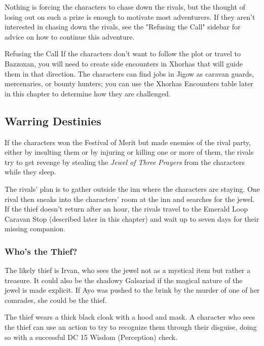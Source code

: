 \documentclass[10pt,a4paper,twoside,fancy,bg=print,twocolumn,openany,nodeprecatedcode]{dndbook}
\begin{document}
Nothing is forcing the characters to chase down the rivals, but the thought of losing out on such a prize is enough to motivate most adventurers. If they aren't interested in chasing down the rivals, see the "Refusing the Call" sidebar for advice on how to continue this adventure.

\begin{DndSidebar}[float=!b]{Refusing the Call}
If the characters don't want to follow the plot or travel to Bazzoxan, you will need to create side encounters in Xhorhas that will guide them in that direction. The characters can find jobs in Jigow as caravan guards, mercenaries, or bounty hunters; you can use the Xhorhas Encounters table later in this chapter to determine how they are challenged.



\end{DndSidebar}

\subsection{Warring Destinies}
If the characters won the Festival of Merit but made enemies of the rival party, either by insulting them or by injuring or killing one or more of them, the rivals try to get revenge by stealing the \textit{Jewel of Three Prayers} from the characters while they sleep.

The rivals' plan is to gather outside the inn where the characters are staying. One rival then sneaks into the characters' room at the inn and searches for the jewel. If the thief doesn't return after an hour, the rivals travel to the Emerald Loop Caravan Stop (described later in this chapter) and wait up to seven days for their missing companion.

\subsubsection{Who's the Thief?}
The likely thief is Irvan, who sees the jewel not as a mystical item but rather a treasure. It could also be the shadowy Galsariad if the magical nature of the jewel is made explicit. If Ayo was pushed to the brink by the murder of one of her comrades, she could be the thief.

The thief wears a thick black cloak with a hood and mask. A character who sees the thief can use an action to try to recognize them through their disguise, doing so with a successful DC 15 Wisdom (Perception) check.
\end{document}
